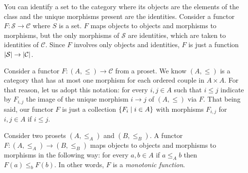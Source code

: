 \begin{example}\label{example:CollectionsAreCats}
  You can identify a set to the category where its objects are the
  elements of the class and the unique morphisms present are the
  identities. Consider a functor \(F : \mathcal{S} \to \mathcal{C}\) where \(S\) is
  a set. \(F\) maps objects to objects and morphisms to morphisms, but
  the only morphisms of \(\mathcal{S}\) are identities, which are taken to
  identities of \(\mathcal{C}\). Since \(F\) involves only objects and
  identities, \(F\) is just a function \(\left\lvert\mathcal{S}\right\rvert \to \left\lvert\mathcal{C}\right\rvert\).
\end{example}

\begin{example}
  Consider a functor \(F : (A, \le) \to \mathcal{C}\) from a proset. We know
  \((A, \le)\) is a category that has at most one morphism for each
  ordered couple in \(A \times A\). For that reason, let us adopt this
  notation: for every \(i, j \in A\) such that \(i \le j\) indicate by
  \(F_{i,j}\) the image of the unique morphism \(i \to j\) of
  \((A, \le)\) via \(F\). That being said, our functor \(F\) is just a
  collection \(\left\{F_i \mid i \in A\right\}\) with morphisms \(F_{i,j}\) for
  \(i, j \in A\) if \(i \le j\).
\end{example}

\begin{example}
  Consider two prosets \((A, \le_A)\) and \((B, \le_B)\). A functor
  \(F : (A, \le_A) \to (B, \le_B)\) maps objects to objects and morphisms to
  morphisms in the following way: for every \(a, b \in A\) if
  \(a \le_A b\) then \(F(a) \le_b F(b)\). In other words, \(F\) is a {\em
    monotonic function}.
\end{example}

